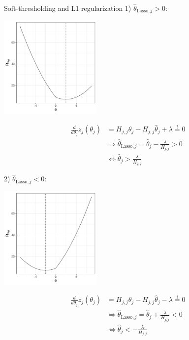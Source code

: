 \documentclass[11pt,compress,t,notes=noshow, xcolor=table]{beamer}
\begin{document}
\begin{vbframe}{Soft-thresholding and L1 regularization}
1) $\hat{\theta}_{\text{Lasso},j} > 0:$ \\
\lz
\begin{minipage}{0.4\textwidth}
    \includegraphics[width=5cm]{figure/th_l1_pos.pdf}
\end{minipage}
\hfill
\begin{minipage}{0.49\textwidth}
\begin{align*}
    \frac{d}{d \theta_j}z_j(\theta_j) &= H_{j,j}\theta_j - H_{j,j} \hat{\theta}_j + \lambda \overset{!}{=} 0 \\
    &\Rightarrow  \hat{\theta}_{\text{Lasso},j} = \hat{\theta}_j 
 -\frac{\lambda}{H_{j,j}} > 0 \\
 &\iff \hat{\theta}_j >  \frac{\lambda}{H_{j,j}}
\end{align*}
\end{minipage}
 \newpage

2) $\hat{\theta}_{\text{Lasso},j} < 0:$ \\
\lz
\begin{minipage}{0.4\textwidth}
    \includegraphics[width=5cm]{figure/th_l1_neg.pdf}
\end{minipage}
\hfill
\begin{minipage}{0.49\textwidth}
\begin{align*}
    \frac{d}{d \theta_j}z_j(\theta_j) &= H_{j,j}\theta_j - H_{j,j} \hat{\theta}_j - \lambda \overset{!}{=} 0 \\
    &\Rightarrow  \hat{\theta}_{\text{Lasso},j} = \hat{\theta}_j 
 +\frac{\lambda}{H_{j,j}} < 0 \\
 &\iff \hat{\theta}_j < -\frac{\lambda}{H_{j,j}}
\end{align*}
\end{minipage}
 \newpage



\end{vbframe}
\end{document}
